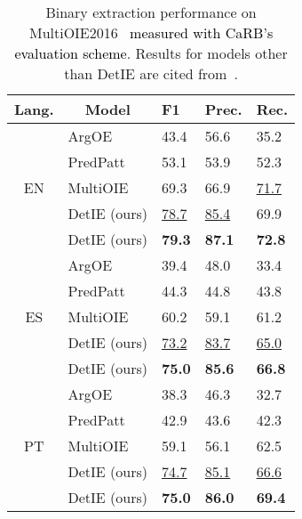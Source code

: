 \documentclass[letterpaper]{article} \usepackage{aaai22}  \usepackage{times}  \usepackage{helvet}  \usepackage{courier}  \usepackage[hyphens]{url}  \usepackage{graphicx} \usepackage{placeins}
\newcommand{\added}[1]{\textcolor{black}{#1}}
\begin{document}
\begin{table}[!t]
\centering\small
\begin{tabularx}{\columnwidth}{c|l|XXX}
\toprule
Lang.               & \multicolumn{1}{c|}{Model}
                    & F1 & Prec. & Rec. \\ \hline
    \multirow{5}{*}{EN} & \small ArgOE
                    & 43.4 & 56.6 & 35.2                            \\
                    & \small PredPatt
                    & 53.1 & 53.9 & 52.3                            \\
                    & \small MultiOIE
                    & 69.3 & 66.9 & \underline{71.7} \\ 
                    & \small DetIE (ours)
                    & \underline{78.7} & \underline{85.4} & 69.9 \\
                    & \small DetIE (ours)
                    & \textbf{79.3} & \textbf{87.1} & \textbf{72.8} \\
                    \hline
    \multirow{5}{*}{ES} & \small ArgOE  
                    & 39.4 & 48.0 & 33.4                            \\
                    & \small PredPatt  
                    & 44.3 & 44.8 & 43.8                            \\
                    & \small MultiOIE 
                    & 60.2 & 59.1 & 61.2 \\ 
                    & \small DetIE (ours) 
                    & \underline{73.2} & \underline{83.7} & \underline{65.0} \\
                    & \small DetIE (ours)
                    & \textbf{75.0} & \textbf{85.6} & \textbf{66.8} \\
                    \hline
    \multirow{5}{*}{PT} & \small ArgOE    
                    & 38.3 & 46.3 & 32.7                   \\
                    & \small PredPatt  
                    & 42.9 & 43.6 & 42.3                            \\
                    & \small MultiOIE
                    & 59.1 & 56.1 & 62.5          \\
                    & \small DetIE (ours)
                    & \underline{74.7} & \underline{85.1} & \underline{66.6} \\
                    & \small DetIE (ours)
                    & \textbf{75.0} & \textbf{86.0} & \textbf{69.4} \\
\bottomrule
\end{tabularx}

\caption{Binary extraction performance on MultiOIE2016~\cite{zhan2020span} \added{measured with CaRB’s evaluation scheme}. Results for models other than DetIE are cited from~\cite{ro2020multi}.}
\label{tab:multioie}
\end{table}
\end{document}
